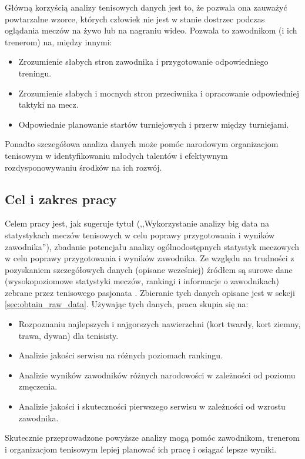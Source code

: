 \documentclass[12pt, a4paper]{article}
\begin{document}
Główną korzyścią analizy tenisowych danych jest to, że pozwala ona zauważyć powtarzalne wzorce, których człowiek nie jest w stanie dostrzec podczas oglądania meczów na żywo lub na nagraniu wideo. Pozwala to zawodnikom (i ich trenerom) na, między innymi:
\begin{itemize}
    \item Zrozumienie słabych stron zawodnika i przygotowanie odpowiedniego treningu.
    \item Zrozumienie słabych i mocnych stron przeciwnika i opracowanie odpowiedniej taktyki na mecz.
    \item Odpowiednie planowanie startów turniejowych i przerw między turniejami.
\end{itemize}
Ponadto szczegółowa analiza danych może pomóc narodowym organizacjom tenisowym w identyfikowaniu młodych talentów i efektywnym rozdysponowywaniu środków na ich rozwój.

\subsection{Cel i zakres pracy}
Celem pracy jest, jak sugeruje tytuł (,,Wykorzystanie analizy big data na statystykach meczów tenisowych w celu poprawy przygotowania i wyników zawodnika''), zbadanie potencjału analizy ogólnodostępnych statystyk meczowych w celu poprawy przygotowania i wyników zawodnika. Ze względu na trudności z pozyskaniem szczegółowych danych (opisane wcześniej) źródłem są surowe dane (wysokopoziomowe statystyki meczów, rankingi i informacje o zawodnikach) zebrane przez tenisowego pasjonata \cite{tennis_atp, tennis_wta}. Zbieranie tych danych opisane jest w sekcji \ref{sec:obtain_raw_data}. Używając tych danych, praca skupia się na:
\begin{itemize}
    \item Rozpoznaniu najlepszych i najgorszych nawierzchni (kort twardy, kort ziemny, trawa, dywan) dla tenisisty.
    \item Analizie jakości serwisu na różnych poziomach rankingu.
    \item Analizie wyników zawodników różnych narodowości w zależności od poziomu zmęczenia.
    \item Analizie jakości i skuteczności pierwszego serwisu w zależności od wzrostu zawodnika.
\end{itemize}
Skutecznie przeprowadzone powyższe analizy mogą pomóc zawodnikom, trenerom i organizacjom tenisowym lepiej planować ich pracę i osiągać lepsze wyniki.
\end{document}
